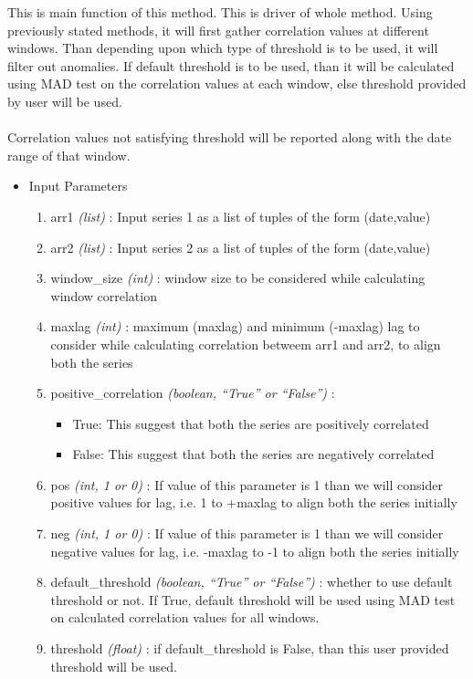 This is main function of this method. This is driver of whole method. Using 
previously stated methods, it will first gather correlation values at different 
windows. Than depending upon which type of threshold is to be used, it will 
filter out anomalies. If default threshold is to be used, than it will be 
calculated using MAD test on the correlation values at each window, else 
threshold provided by user will be used. \\
\\
Correlation values not satisfying threshold will be reported along with the date 
range of that window.\\


\begin{itemize}
 \item Input Parameters
 
 \begin{enumerate}
  \item arr1 \textit{(list)} : Input series 1 as a list of tuples of the form 
(date,value)
  \item arr2 \textit{(list)} : Input series 2 as a list of tuples of the form 
(date,value)
  \item window\_size \textit{(int)} : window size to be considered while 
calculating window correlation
  \item maxlag \textit{(int)} : maximum (maxlag) and minimum (-maxlag) lag to 
consider while calculating correlation betweem arr1 and arr2, to align both the 
series
  \item positive\_correlation \textit{(boolean, ``True'' or ``False'')} : 
      \begin{itemize}
       \item True: This suggest that both the series are positively correlated
       \item False: This suggest that both the series are negatively correlated
      \end{itemize}
      
  \item pos \textit{(int, 1 or 0)} : If value of this parameter is 1 than we 
will consider positive values for lag, i.e. 1 to +maxlag to align both the 
series initially
  \item neg \textit{(int, 1 or 0)} : If value of this parameter is 1 than we 
will consider negative values for lag, i.e. -maxlag to -1 to align both the 
series initially
  \item default\_threshold \textit{(boolean, ``True'' or ``False'')} : whether 
to use default threshold or not. If True, default threshold will be used using 
MAD test on calculated correlation values for all windows.
  \item threshold \textit{(float)} : if default\_threshold is False, than this 
user provided threshold will be used.
 \end{enumerate}


\end{itemize}
